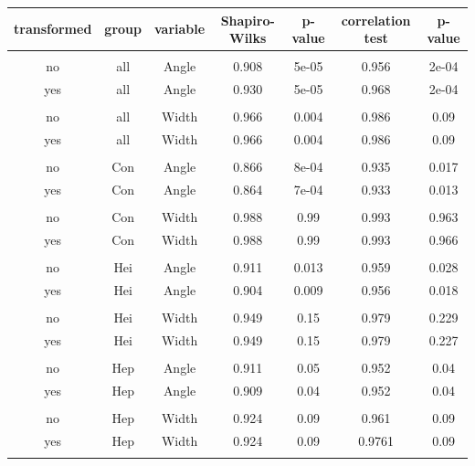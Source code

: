 \begin{center}
\begin{tabular}{| c | c c | c c | c c |} 
	\hline
	transformed & group & variable & Shapiro-Wilks & p-value & correlation test & p-value \\
	\hline
	&&&&&&\\
	no & all & Angle & 0.908 & 5e-05 & 0.956 & 2e-04 \\
	yes & all & Angle & 0.930 & 5e-05 & 0.968 & 2e-04 \\
	&&&&&&\\
	no & all & Width & 0.966 & 0.004 & 0.986 & 0.09 \\
	yes & all & Width & 0.966 & 0.004 & 0.986 & 0.09 \\
	&&&&&&\\
	no & Con & Angle & 0.866 & 8e-04 & 0.935 & 0.017 \\
	yes & Con & Angle & 0.864 & 7e-04 & 0.933 & 0.013 \\
	&&&&&&\\
	no & Con & Width & 0.988 & 0.99 & 0.993 & 0.963 \\
	yes & Con & Width & 0.988 & 0.99 & 0.993 & 0.966 \\
	&&&&&&\\
	no & Hei & Angle & 0.911 & 0.013 & 0.959 & 0.028 \\
	yes & Hei & Angle & 0.904 & 0.009 & 0.956 & 0.018 \\
	&&&&&&\\
	no & Hei & Width & 0.949 & 0.15 & 0.979 & 0.229 \\
	yes & Hei & Width & 0.949 & 0.15 & 0.979 & 0.227 \\
	&&&&&&\\
	no & Hep & Angle & 0.911 & 0.05 & 0.952 & 0.04 \\
	yes & Hep & Angle & 0.909 & 0.04 & 0.952 & 0.04 \\
	&&&&&&\\
	no & Hep & Width & 0.924 & 0.09 & 0.961 & 0.09 \\
	yes & Hep & Width & 0.924 & 0.09 & 0.9761 & 0.09 \\
	&&&&&&\\
	\hline
\end{tabular}
\end{center}

